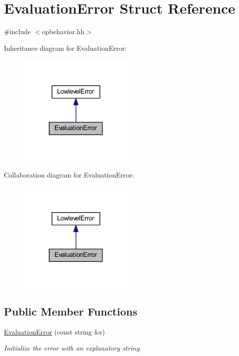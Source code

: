 \hypertarget{struct_evaluation_error}{}\section{Evaluation\+Error Struct Reference}
\label{struct_evaluation_error}


{\ttfamily \#include $<$opbehavior.\+hh$>$}



Inheritance diagram for Evaluation\+Error\+:
\nopagebreak
\begin{figure}[H]
\begin{center}
\leavevmode
\includegraphics[width=162pt]{struct_evaluation_error__inherit__graph}
\end{center}
\end{figure}


Collaboration diagram for Evaluation\+Error\+:
\nopagebreak
\begin{figure}[H]
\begin{center}
\leavevmode
\includegraphics[width=162pt]{struct_evaluation_error__coll__graph}
\end{center}
\end{figure}
\subsection*{Public Member Functions}
\begin{DoxyCompactItemize}
\item 
\mbox{\hyperlink{struct_evaluation_error_af252f4ade5332e2523addf03d68c4ebd}{Evaluation\+Error}} (const string \&s)
\begin{DoxyCompactList}\small\item\em Initialize the error with an explanatory string. \end{DoxyCompactList}\end{DoxyCompactItemize}
